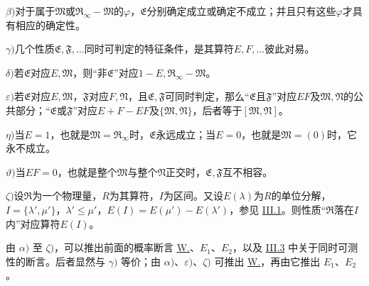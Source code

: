 \documentclass[fontsize=13pt,twoside,openany,headings=normal,parskip=false,bookmarkpackage=false,DIV=calc]{scrbook}
\begin{document}
\leavevmode{}\label{post:III.5.beta}\textbf{$\beta)$}对于属于$\mathfrak M$或$\mathfrak R_\infty-\mathfrak M$的$\varphi$，$\mathfrak E$分别确定成立或确定不成立；并且只有这些$\varphi$才具有相应的确定性。

\leavevmode{}\label{post:III.5.gamma}\textbf{$\gamma)$}几个性质$\mathfrak E,\allowbreak \mathfrak F,\allowbreak \ldots$同时可判定的特征条件，是其算符$E,\allowbreak F,\allowbreak \ldots$彼此对易。

\leavevmode{}\label{post:III.5.delta}\textbf{$\delta)$}若$\mathfrak E$对应$E,\allowbreak \mathfrak M$，则“非$\mathfrak E$”对应$1-E,\allowbreak \mathfrak R_\infty-\mathfrak M$。

\leavevmode{}\label{post:III.5.epsilon}\textbf{$\varepsilon)$}若$\mathfrak E$对应$E,\allowbreak \mathfrak M$，$\mathfrak F$对应$F,\allowbreak \mathfrak N$，且$\mathfrak E,\allowbreak \mathfrak F$可同时判定，那么“$\mathfrak E$且$\mathfrak F$”对应$EF$及$\mathfrak M,\allowbreak \mathfrak N$的公共部分；“$\mathfrak E$或$\mathfrak F$”对应$E+F-EF$及$\{\mathfrak M,\allowbreak \mathfrak N\}$，后者等于$[\mathfrak M,\allowbreak \mathfrak N]$。

\leavevmode{}\label{post:III.5.eta}\textbf{$\eta)$}当$E=1$，也就是$\mathfrak M=\mathfrak R_\infty$时，$\mathfrak E$永远成立；当$E=0$，也就是$\mathfrak M=(0)$时，它永不成立。

\leavevmode{}\label{post:III.5.theta}\textbf{$\vartheta)$}当$EF=0$，也就是整个$\mathfrak M$与整个$\mathfrak N$正交时，$\mathfrak E,\allowbreak \mathfrak F$互不相容。

\leavevmode{}\label{post:III.5.zeta}\textbf{$\zeta)$}设$\mathfrak R$为一个物理量，$R$为其算符，$I$为区间。又设$E(\lambda)$为$R$的单位分解，$I=\{\lambda',\allowbreak \mu'\}$，$\lambda'\le\mu'$，$E(I)=E(\mu')-E(\lambda')$，参见 \hyperref[sec:III.1]{III.1}。则性质“$\mathfrak R$落在$I$内”对应算符$E(I)$。

由 \hyperref[post:III.5.alpha]{$\alpha)$} 至 \hyperref[post:III.5.zeta]{$\zeta)$}，可以推出前面的概率断言 \hyperref[post:III.1.W]{W.}、\hyperref[post:III.1.E1]{$E_1$}、\hyperref[post:III.1.E2]{$E_2$}，以及 \hyperref[sec:III.3]{III.3} 中关于同时可测性的断言。后者显然与 \hyperref[post:III.5.gamma]{$\gamma)$} 等价；由 \hyperref[post:III.5.alpha]{$\alpha)$}、\hyperref[post:III.5.epsilon]{$\varepsilon)$}、\hyperref[post:III.5.zeta]{$\zeta)$} 可推出 \hyperref[post:III.1.W]{W.}，再由它推出 \hyperref[post:III.1.E1]{$E_1$}、\hyperref[post:III.1.E2]{$E_2$}。
\end{document}
